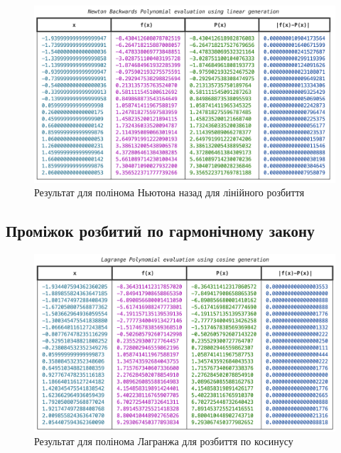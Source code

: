 \documentclass[12pt]{extarticle}
\begin{document}
\begin{figure}[H]
    \centering
    \includegraphics[width=\textwidth]{images/lab_1/newton_back_linear.png}
    \caption{Результат для полінома Ньютона назад для лінійного розбиття}
    \label{fig:6}
\end{figure}
\vspace{5px}

\subsection{Проміжок розбитий по гармонічному закону}

\begin{figure}[H]
    \centering
    \includegraphics[width=\textwidth]{images/lab_1/lagrange_cosine.png}
    \caption{Результат для полінома Лагранжа для розбиття по косинусу}
    \label{fig:6}
\end{figure}
\vspace{5px}
\end{document}
